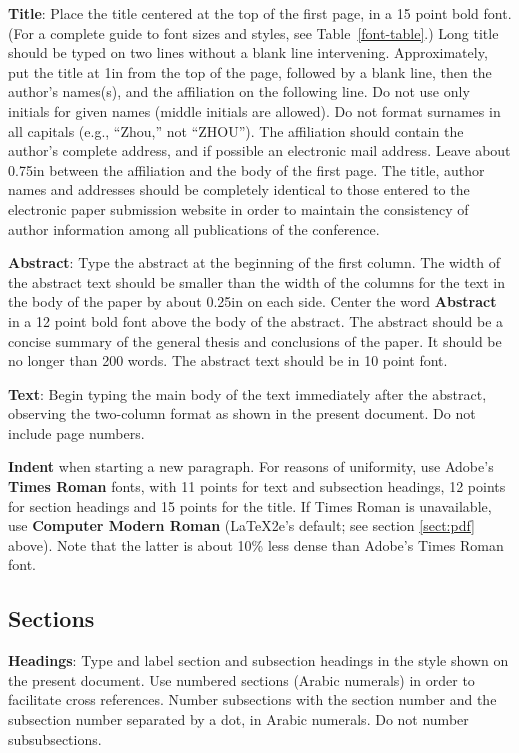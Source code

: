 \documentclass[11pt,letterpaper]{article}
\begin{document}
{\bf Title}: Place the title centered at the top of the first page, in
a 15 point bold font.  (For a complete guide to font sizes and styles, see Table~\ref{font-table}.)
Long title should be typed on two lines without
a blank line intervening. Approximately, put the title at 1in from the
top of the page, followed by a blank line, then the author's names(s),
and the affiliation on the following line.  Do not use only initials
for given names (middle initials are allowed). Do not format surnames
in all capitals (e.g., ``Zhou,'' not ``ZHOU'').  The affiliation should
contain the author's complete address, and if possible an electronic
mail address. Leave about 0.75in between the affiliation and the body
of the first page. The title, author names and addresses should be completely identical to those entered to the electronic paper submission website in order to maintain the consistency of author information among all publications of the conference.

{\bf Abstract}: Type the abstract at the beginning of the first
column.  The width of the abstract text should be smaller than the
width of the columns for the text in the body of the paper by about
0.25in on each side.  Center the word {\bf Abstract} in a 12 point
bold font above the body of the abstract. The abstract should be a
concise summary of the general thesis and conclusions of the paper.
It should be no longer than 200 words. The abstract text should be in 10 point font.

{\bf Text}: Begin typing the main body of the text immediately after
the abstract, observing the two-column format as shown in
the present document. Do not include page numbers.

{\bf Indent} when starting a new paragraph. For reasons of uniformity,
use Adobe's {\bf Times Roman} fonts, with 11 points for text and
subsection headings, 12 points for section headings and 15 points for
the title.  If Times Roman is unavailable, use {\bf Computer Modern
  Roman} (\LaTeX2e's default; see section \ref{sect:pdf} above).
Note that the latter is about 10\% less dense than Adobe's Times Roman
font.

\subsection{Sections}

{\bf Headings}: Type and label section and subsection headings in the
style shown on the present document.  Use numbered sections (Arabic
numerals) in order to facilitate cross references. Number subsections
with the section number and the subsection number separated by a dot,
in Arabic numerals. Do not number subsubsections.
\end{document}
